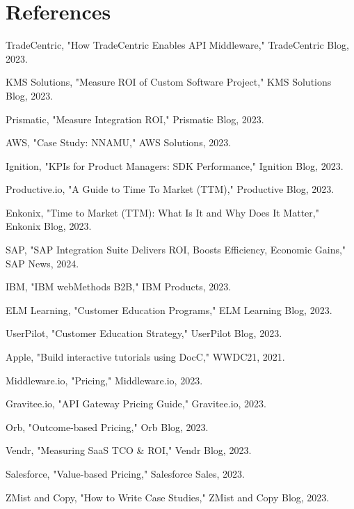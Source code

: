 \documentclass[11pt,a4paper]{article}
\begin{document}
\section*{References}
\begin{thebibliography}{99}

 TradeCentric, "How TradeCentric Enables API Middleware," TradeCentric Blog, 2023.

 KMS Solutions, "Measure ROI of Custom Software Project," KMS Solutions Blog, 2023.

 Prismatic, "Measure Integration ROI," Prismatic Blog, 2023.

 AWS, "Case Study: NNAMU," AWS Solutions, 2023.

 Ignition, "KPIs for Product Managers: SDK Performance," Ignition Blog, 2023.

 Productive.io, "A Guide to Time To Market (TTM)," Productive Blog, 2023.

 Enkonix, "Time to Market (TTM): What Is It and Why Does It Matter," Enkonix Blog, 2023.

 SAP, "SAP Integration Suite Delivers ROI, Boosts Efficiency, Economic Gains," SAP News, 2024.

 IBM, "IBM webMethods B2B," IBM Products, 2023.

 ELM Learning, "Customer Education Programs," ELM Learning Blog, 2023.

 UserPilot, "Customer Education Strategy," UserPilot Blog, 2023.

 Apple, "Build interactive tutorials using DocC," WWDC21, 2021.

 Middleware.io, "Pricing," Middleware.io, 2023.

 Gravitee.io, "API Gateway Pricing Guide," Gravitee.io, 2023.

 Orb, "Outcome-based Pricing," Orb Blog, 2023.

 Vendr, "Measuring SaaS TCO \& ROI," Vendr Blog, 2023.

 Salesforce, "Value-based Pricing," Salesforce Sales, 2023.

 ZMist and Copy, "How to Write Case Studies," ZMist and Copy Blog, 2023.


\end{thebibliography}
\end{document}
